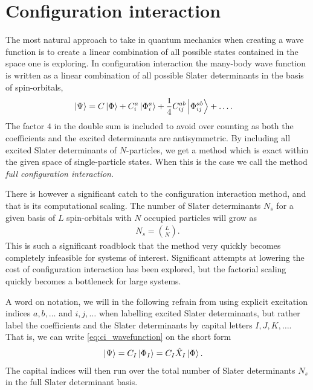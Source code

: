 \chapter{Configuration interaction}
    \label{chap:ci}
    The most natural approach to take in quantum mechanics when creating a wave
    function is to create a linear combination of all possible states contained
    in the space one is exploring.
    In configuration interaction the many-body wave function is written as a
    linear combination of all possible Slater determinants in the basis of
    spin-orbitals,
    \begin{align}
        \ket{\Psi}
        &= C\ket{\Phi}
        + C^a_i\ket{\Phi^{a}_{i}}
        + \frac{1}{4}C^{ab}_{ij}\ket{\Phi^{ab}_{ij}}
        + \dots.
        \label{eq:ci_wavefunction}
    \end{align}
    The factor $4$ in the double sum is included to avoid over counting as both
    the coefficients and the excited determinants are antisymmetric.
    By including all excited Slater determinants of $N$-particles, we get a
    method which is exact within the given space of single-particle states.
    When this is the case we call the method \emph{full configuration
    interaction}.

    There is however a significant catch to the configuration interaction
    method, and that is its computational scaling.
    The number of Slater determinants $N_{s}$ for a given basis of $L$
    spin-orbitals with $N$ occupied particles will grow as \cite{kvaal2017notes}
    \begin{align}
        N_{s} = \binom{L}{N}.
    \end{align}
    This is such a significant roadblock that the method very quickly becomes
    completely infeasible for systems of interest.
    Significant attempts at lowering the cost of configuration interaction has
    been explored, but the factorial scaling quickly becomes a bottleneck for
    large systems.

    A word on notation, we will in the following refrain from using explicit
    excitation indices $a, b, \dots$ and $i, j, \dots$ when labelling excited
    Slater determinants, but rather label the coefficients and the Slater
    determinants by capital letters $I, J, K, \dots$.
    That is, we can write \autoref{eq:ci_wavefunction} on the short form
    \begin{align}
        \ket{\Psi}
        &= C_{I}\ket{\Phi_I}
        = C_{I}\hat{X}_I\ket{\Phi}.
    \end{align}
    The capital indices will then run over the total number of Slater
    determinants $N_s$ in the full Slater determinant basis.

